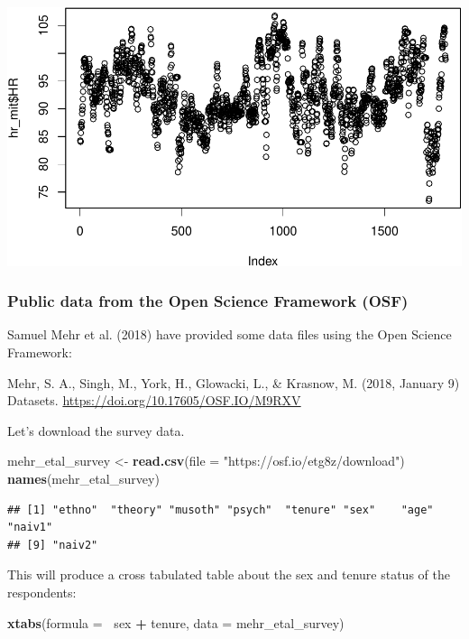 \documentclass[]{article}
\newenvironment{Shaded}{\begin{snugshade}}{\end{snugshade}}
\newcommand{\KeywordTok}[1]{\textcolor[rgb]{0.13,0.29,0.53}{\textbf{#1}}}
\newcommand{\DataTypeTok}[1]{\textcolor[rgb]{0.13,0.29,0.53}{#1}}
\newcommand{\StringTok}[1]{\textcolor[rgb]{0.31,0.60,0.02}{#1}}
\newcommand{\OperatorTok}[1]{\textcolor[rgb]{0.81,0.36,0.00}{\textbf{#1}}}
\newcommand{\NormalTok}[1]{#1}
\begin{document}
\includegraphics{slow-r_files/figure-latex/unnamed-chunk-60-1.pdf}

\subsubsection{Public data from the Open Science Framework
(OSF)}\label{public-data-from-the-open-science-framework-osf}

Samuel Mehr et al. (2018) have provided some data files using the Open
Science Framework:

Mehr, S. A., Singh, M., York, H., Glowacki, L., \& Krasnow, M. (2018,
January 9) Datasets. \url{https://doi.org/10.17605/OSF.IO/M9RXV}

Let's download the survey data.

\begin{Shaded}
\begin{Highlighting}[]
\NormalTok{mehr_etal_survey <-}\StringTok{ }\KeywordTok{read.csv}\NormalTok{(}\DataTypeTok{file =} \StringTok{"https://osf.io/etg8z/download"}\NormalTok{)}
\KeywordTok{names}\NormalTok{(mehr_etal_survey)}
\end{Highlighting}
\end{Shaded}

\begin{verbatim}
## [1] "ethno"  "theory" "musoth" "psych"  "tenure" "sex"    "age"    "naiv1" 
## [9] "naiv2"
\end{verbatim}

This will produce a cross tabulated table about the sex and tenure
status of the respondents:

\begin{Shaded}
\begin{Highlighting}[]
\KeywordTok{xtabs}\NormalTok{(}\DataTypeTok{formula =} \OperatorTok{~}\NormalTok{sex }\OperatorTok{+}\StringTok{ }\NormalTok{tenure, }\DataTypeTok{data =}\NormalTok{ mehr_etal_survey)}
\end{Highlighting}
\end{Shaded}
\end{document}
